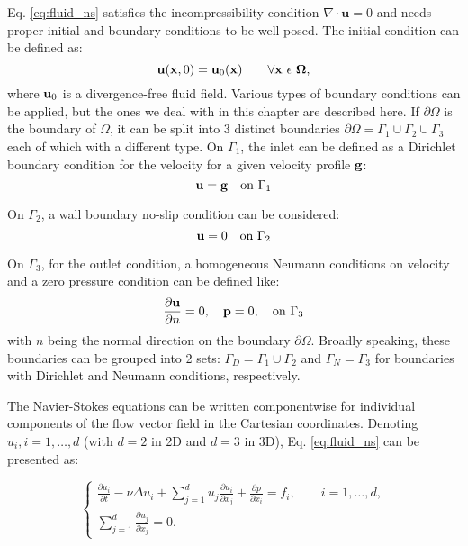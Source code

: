 Eq. \ref{eq:fluid_ns} satisfies the incompressibility condition $\nabla\cdot\mathbf{u}=0$ and needs proper initial and boundary conditions to be well posed. The initial condition can be defined as:
\begin{equation}
{\bf u}({\bf x},0)={\bf u}_{0}({\bf x})\qquad \forall{\bf x}\ \epsilon\ {\bf \Omega,}
\end{equation}
where ${\bf u}_{0}$ is a divergence-free fluid field. Various types of boundary conditions can be applied, but the ones we deal with in this chapter are described here. If $\partial \Omega$ is the boundary of $\Omega$, it can be split into 3 distinct boundaries $\partial \Omega=\Gamma_{1} \cup \Gamma_{2} \cup \Gamma_{3}$ each of which with a different type. On $\Gamma_{1}$, the inlet can be defined as a Dirichlet boundary condition for the velocity for a given velocity profile ${\bf g}$:
\begin{equation}
{\bf u} = {\bf g} \quad \text{on } \Gamma_1
\end{equation}

On $\Gamma_2$, a wall boundary no-slip condition can be considered:
\begin{equation}
{\bf u} = 0 \quad \text{on } \Gamma_2
\end{equation}

On $\Gamma_3$, for the outlet condition, a homogeneous Neumann conditions on velocity and a zero pressure condition can be defined like:
\begin{equation} \label{eq:fluid_gamma3}
\frac{\partial {\bf u}}{\partial n} = 0, \quad \mathbf{p} = 0, \quad \text{on } \Gamma_3
\end{equation}
with $n$ being the normal direction on the boundary $\partial \Omega$. Broadly speaking, these boundaries can be grouped into 2 sets: $\Gamma_{D} = \Gamma_{1} \cup \Gamma_{2}$ and $\Gamma_{N} = \Gamma_{3}$ for boundaries with Dirichlet and Neumann conditions, respectively.

The Navier-Stokes equations can be written componentwise for individual components of the flow vector field in the Cartesian coordinates. Denoting $u_i, i=1,\ldots,d$ (with $d=2$ in 2D and $d=3$ in 3D), Eq. \ref{eq:fluid_ns} can be presented as:

\begin{equation}
\left\{ {\begin{array}{*{20}{l}}
\displaystyle  {\frac{{\partial {u_i}}}{{\partial t}} - \nu \Delta {u_i} + \mathop \sum \limits_{j = 1}^d {u_j}\frac{{\partial {u_i}}}{{\partial {x_j}}} + \frac{{\partial p}}{{\partial {x_i}}} = {f_i},\qquad i = 1, \ldots ,d,} \\
\displaystyle  {\mathop \sum \limits_{j = 1}^d \frac{{\partial {u_j}}}{{\partial {x_j}}} = 0.}
\end{array}} \right.
\end{equation}


